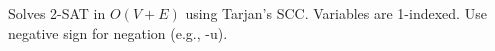 
Solves 2-SAT in $O(V + E)$ using Tarjan's SCC. Variables are 1-indexed. Use negative sign for negation (e.g., -u).


